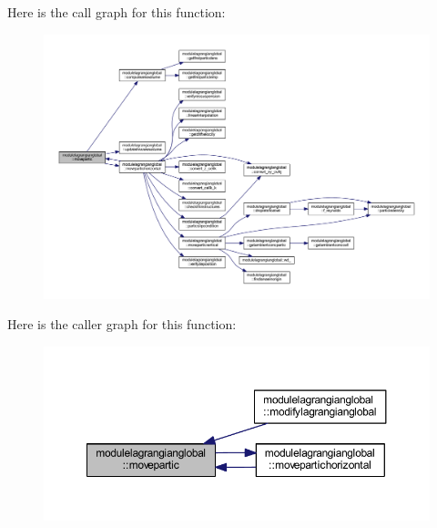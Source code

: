 Here is the call graph for this function\+:\nopagebreak
\begin{figure}[H]
\begin{center}
\leavevmode
\includegraphics[width=350pt]{namespacemodulelagrangianglobal_a82279a8ab7ce219fe5a1bfff091e611f_cgraph}
\end{center}
\end{figure}
Here is the caller graph for this function\+:\nopagebreak
\begin{figure}[H]
\begin{center}
\leavevmode
\includegraphics[width=350pt]{namespacemodulelagrangianglobal_a82279a8ab7ce219fe5a1bfff091e611f_icgraph}
\end{center}
\end{figure}
\mbox{\label{namespacemodulelagrangianglobal_ab81fef0d1f9d7e83be8f27e7313bf968}} 
